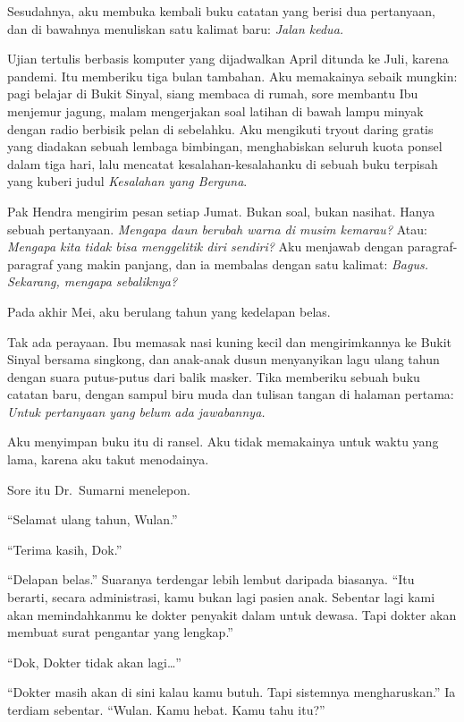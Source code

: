 \documentclass[11pt,twoside,openany]{book}
\makeatletter
\newcommand{\scenebreak}{\par\vspace{0.9em}{\centering\textsc{*\hspace{0.7em}*\hspace{0.7em}*}\par}\vspace{0.9em}\@afterindentfalse\@afterheading}
\makeatother
\begin{document}
Sesudahnya, aku membuka kembali buku catatan yang berisi dua pertanyaan, dan di bawahnya menuliskan satu kalimat baru: \emph{Jalan kedua.}

Ujian tertulis berbasis komputer yang dijadwalkan April ditunda ke Juli, karena pandemi. Itu memberiku tiga bulan tambahan. Aku memakainya sebaik mungkin: pagi belajar di Bukit Sinyal, siang membaca di rumah, sore membantu Ibu menjemur jagung, malam mengerjakan soal latihan di bawah lampu minyak dengan radio berbisik pelan di sebelahku. Aku mengikuti tryout daring gratis yang diadakan sebuah lembaga bimbingan, menghabiskan seluruh kuota ponsel dalam tiga hari, lalu mencatat kesalahan-kesalahanku di sebuah buku terpisah yang kuberi judul \emph{Kesalahan yang Berguna}.

Pak Hendra mengirim pesan setiap Jumat. Bukan soal, bukan nasihat. Hanya sebuah pertanyaan. \emph{Mengapa daun berubah warna di musim kemarau?} Atau: \emph{Mengapa kita tidak bisa menggelitik diri sendiri?} Aku menjawab dengan paragraf-paragraf yang makin panjang, dan ia membalas dengan satu kalimat: \emph{Bagus. Sekarang, mengapa sebaliknya?}

\scenebreak
Pada akhir Mei, aku berulang tahun yang kedelapan belas.

Tak ada perayaan. Ibu memasak nasi kuning kecil dan mengirimkannya ke Bukit Sinyal bersama singkong, dan anak-anak dusun menyanyikan lagu ulang tahun dengan suara putus-putus dari balik masker. Tika memberiku sebuah buku catatan baru, dengan sampul biru muda dan tulisan tangan di halaman pertama: \emph{Untuk pertanyaan yang belum ada jawabannya.}

Aku menyimpan buku itu di ransel. Aku tidak memakainya untuk waktu yang lama, karena aku takut menodainya.

Sore itu Dr.~Sumarni menelepon.

``Selamat ulang tahun, Wulan.''

``Terima kasih, Dok.''

``Delapan belas.'' Suaranya terdengar lebih lembut daripada biasanya. ``Itu berarti, secara administrasi, kamu bukan lagi pasien anak. Sebentar lagi kami akan memindahkanmu ke dokter penyakit dalam untuk dewasa. Tapi dokter akan membuat surat pengantar yang lengkap.''

``Dok, Dokter tidak akan lagi\ldots{}''

``Dokter masih akan di sini kalau kamu butuh. Tapi sistemnya mengharuskan.'' Ia terdiam sebentar. ``Wulan. Kamu hebat. Kamu tahu itu?''
\end{document}
